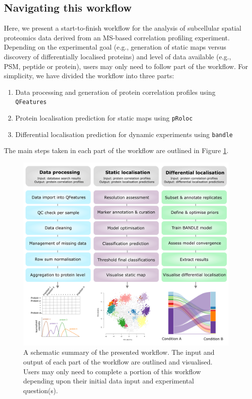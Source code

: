 \documentclass[9pt,a4paper,]{extarticle}
\begin{document}
\subsection{Navigating this workflow}\label{navigating-this-workflow}

Here, we present a start-to-finish workflow for the analysis of subcellular spatial
proteomics data derived from an MS-based correlation profiling experiment. Depending
on the experimental goal (e.g., generation of static maps versus discovery of
differentially localised proteins) and level of data available (e.g., PSM, peptide
or protein), users may only need to follow part of the workflow. For simplicity,
we have divided the workflow into three parts:

\begin{enumerate}
\def\labelenumi{\arabic{enumi}.}
\item
  Data processing and generation of protein correlation profiles using \texttt{QFeatures}
\item
  Protein localisation prediction for static maps using \texttt{pRoloc}
\item
  Differential localisation prediction for dynamic experiments using \texttt{bandle}
\end{enumerate}

The main steps taken in each part of the workflow are outlined in
Figure \ref{fig:workflow-picture}.

\begin{figure}[H]

{\centering \includegraphics[width=0.9\linewidth,]{figs/workflow_outline} 

}

\caption{A schematic summary of the presented workflow. The input and output of each part of the workflow are outlined and visualised. Users may only need to complete a portion of this workflow depending upon their initial data input and experimental question(s).}\label{fig:workflow-picture}
\end{figure}
\end{document}
